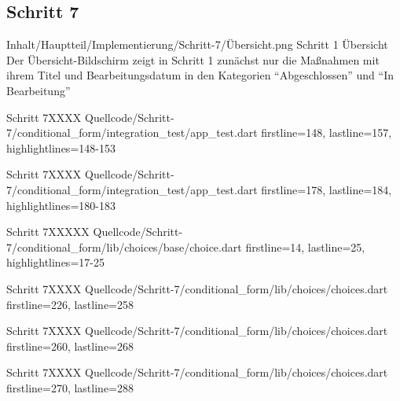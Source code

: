 \ifincludeall \clearpage \fi 

\subsection{Schritt 7}

\begin{alexfigure}{Inhalt/Hauptteil/Implementierung/Schritt-7/Übersicht.png}
  {Schritt 1 Übersicht}
  {Der Übersicht-Bildschirm zeigt in  Schritt 1 zunächst nur die Maßnahmen mit ihrem Titel und Bearbeitungsdatum in den Kategorien \enquote{Abgeschlossen} und \enquote{In Bearbeitung}}

  \label{fig:Schritt1Uebersicht}

\end{alexfigure}

\ifincludeall \clearpage \fi 


\begin{alexlisting}{Schritt 7}{XXXX}
    {Quellcode/Schritt-7/conditional_form/integration_test/app_test.dart}
    {firstline=148, lastline=157, highlightlines={148-153}}
    \label{lst:Schritt5XXXX}
  \end{alexlisting}

  \begin{alexlisting}{Schritt 7}{XXXX}
    {Quellcode/Schritt-7/conditional_form/integration_test/app_test.dart}
    {firstline=178, lastline=184, highlightlines={180-183}}
    \label{lst:Schritt5XXXX}
  \end{alexlisting}


  \begin{alexlisting}{Schritt 7}{XXXXX}
    {Quellcode/Schritt-7/conditional_form/lib/choices/base/choice.dart}
    {firstline=14, lastline=25, highlightlines={17-25}}
    \label{lst:Schritt4XXXXX}
  \end{alexlisting}

  \begin{alexlisting}{Schritt 7}{XXXX}
    {Quellcode/Schritt-7/conditional_form/lib/choices/choices.dart}
    {firstline=226, lastline=258}
    \label{lst:Schritt5XXXX}
  \end{alexlisting}

  \begin{alexlisting}{Schritt 7}{XXXX}
    {Quellcode/Schritt-7/conditional_form/lib/choices/choices.dart}
    {firstline=260, lastline=268}
    \label{lst:Schritt5XXXX}
  \end{alexlisting}

  \begin{alexlisting}{Schritt 7}{XXXX}
    {Quellcode/Schritt-7/conditional_form/lib/choices/choices.dart}
    {firstline=270, lastline=288}
    \label{lst:Schritt5XXXX}
  \end{alexlisting}

